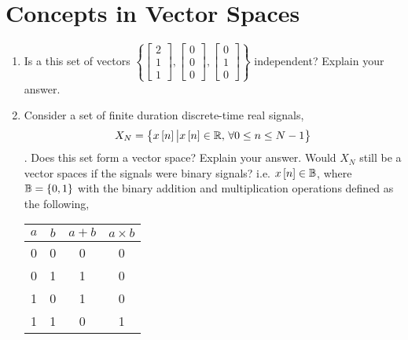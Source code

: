 
\chapter{Concepts in Vector Spaces}

\begin{enumerate}
    \item Is a this set of vectors $\left\{\begin{bmatrix}2 \\ 1 \\ 1\end{bmatrix}, \begin{bmatrix}0 \\ 0\\ 0\end{bmatrix}, \begin{bmatrix}0 \\ 1 \\ 0\end{bmatrix}\right\}$ independent? Explain your answer.

    \item Consider a set of finite duration discrete-time real signals,
    $$X_N = \left\{ x\left[ n\right] \big\vert x\left[ n\right] \in \mathbb{R}, \,\forall 0 \leq n \leq N-1\right\}$$. 
    Does this set form a vector space? Explain your answer. Would $X_N$ still be a vector spaces if the signals were binary signals? i.e. $x\left[ n\right] \in \mathbb{B}$, where $\mathbb{B} = \left\{ 0, 1\right\}$ with the binary addition and multiplication operations defined as the following,

    \begin{center}
    \begin{tabular}{ | c | c | c | c | }
        \hline
        $a$ & $b$ & $a+b$ & $a \times b$ \\ \hline
        0 & 0 & 0   & 0     \\ \hline
        0 & 1 & 1   & 0     \\ \hline
        1 & 0 & 1   & 0     \\ \hline
        1 & 1 & 0   & 1     \\ \hline
    \end{tabular}
    \end{center}


\end{enumerate}
